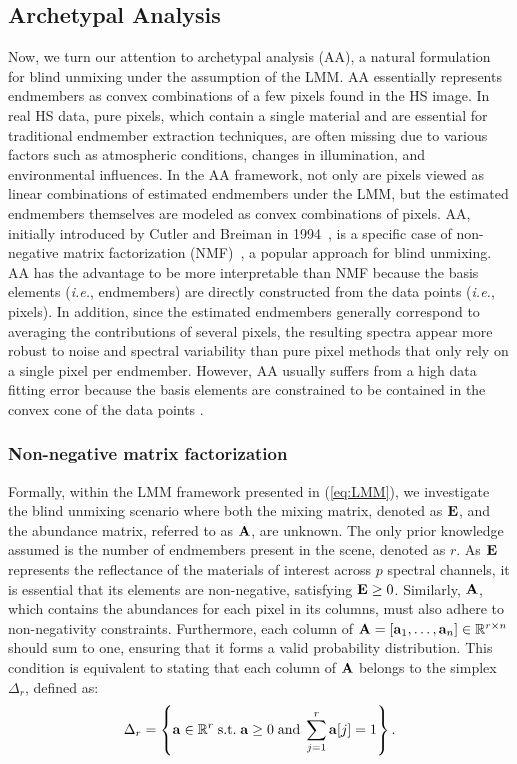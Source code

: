 \subsection{Archetypal Analysis}

Now, we turn our attention to archetypal analysis (AA), a natural formulation for blind unmixing under the assumption of the LMM.
AA essentially represents endmembers as convex combinations of a few pixels found in the HS image.
In real HS data, pure pixels, which contain a single material and are essential for traditional endmember extraction techniques, are often missing due to various factors such as atmospheric conditions, changes in illumination, and environmental influences.
In the AA framework, not only are pixels viewed as linear combinations of estimated endmembers under the LMM, but the estimated endmembers themselves are modeled as convex combinations of pixels.
AA, initially introduced by Cutler and Breiman in 1994~\cite{cutler_archetypal_1994}, is a specific case of non-negative matrix factorization (NMF)~\cite{lee_algorithms_2000, paatero_positive_1994}, a popular approach for blind unmixing.
AA has the advantage to be more interpretable than NMF because the basis elements (\emph{i.e.}, endmembers) are directly constructed from the data points (\emph{i.e.}, pixels).
In addition, since the estimated endmembers generally correspond to averaging the contributions of several pixels, the resulting spectra appear more robust to noise and spectral variability than pure pixel methods that only rely on a single pixel per endmember.
However, AA usually suffers from a high data fitting error because the basis elements are constrained to be contained in the convex cone of the data points \cite{de_handschutter_near-convex_2019}.

\subsubsection{Non-negative matrix factorization}

Formally, within the LMM framework presented in (\ref{eq:LMM}), we investigate the blind unmixing scenario where both the mixing matrix, denoted as $\mathbf E$, and the abundance matrix, referred to as $\mathbf A$, are unknown.
The only prior knowledge assumed is the number of endmembers present in the scene, denoted as $r$.
As $\mathbf E$ represents the reflectance of the materials of interest across $p$ spectral channels, it is essential that its elements are non-negative, satisfying $\mathbf E \geq 0$.
Similarly, $\mathbf A$, which contains the abundances for each pixel in its columns, must also adhere to non-negativity constraints.
Furthermore, each column of $\mathbf A = \left[\mathbf a_1, \ldots, \mathbf a_n\right] \in \mathbb R^{r \times n}$ should sum to one, ensuring that it forms a valid probability distribution.
This condition is equivalent to stating that each column of $\mathbf A$ belongs to the simplex $\Delta_r$, defined as:
\begin{equation}
    \label{eq:simplex}
    \Delta_r = \left\{\mathbf a \in \mathbb R^r \; \text{s.t.} \; \mathbf a \geq 0 \; \text{and} \; \sum_{j=1}^{r} \mathbf a[j] = 1\right\}.
\end{equation}

